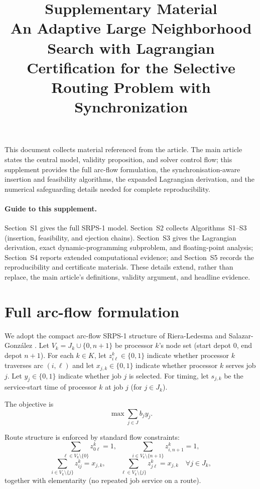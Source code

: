 \documentclass[11pt]{article}
\title{Supplementary Material\\
\large An Adaptive Large Neighborhood Search with Lagrangian Certification
for the Selective Routing Problem with Synchronization}
\author{}
\date{}
\begin{document}
\maketitle

\noindent
This document collects material referenced from the article. The main article
states the central model, validity proposition, and solver control flow; this
supplement provides the full arc-flow formulation, the synchronisation-aware
insertion and feasibility algorithms, the expanded Lagrangian derivation, and
the numerical safeguarding details needed for complete reproducibility.

\paragraph{Guide to this supplement.} Section~S1 gives the full SRPS-1 model.
Section~S2 collects Algorithms~S1--S3 (insertion, feasibility, and ejection
chains). Section~S3 gives the Lagrangian derivation, exact dynamic-programming
subproblem, and floating-point analysis; Section~S4 reports extended
computational evidence; and Section~S5 records the reproducibility and
certificate materials. These details extend, rather than replace, the main
article's definitions, validity argument, and headline evidence.

\section{Full arc-flow formulation}

We adopt the compact arc-flow SRPS-1 structure of Riera-Ledesma and Salazar-Gonz\'alez \cite{RieraLedesma2021SRPS}. Let $V_k=J_k\cup\{0,n+1\}$ be processor $k$'s node set (start depot $0$, end depot $n+1$). For each $k\in K$, let $z_{i\ell}^k\in\{0,1\}$ indicate whether processor $k$ traverses arc $(i,\ell)$ and let $x_{j,k}\in\{0,1\}$ indicate whether processor $k$ serves job $j$. Let $y_j\in\{0,1\}$ indicate whether job $j$ is selected. For timing, let $s_{j,k}$ be the service-start time of processor $k$ at job $j$ (for $j\in J_k$).

The objective is
\[
\max \sum_{j\in J} b_j y_j.
\]

Route structure is enforced by standard flow constraints:
\[
\sum_{\ell\in V_k\setminus\{0\}} z_{0\ell}^k = 1,\qquad
\sum_{i\in V_k\setminus\{n+1\}} z_{i,n+1}^k = 1,
\]
\[
\sum_{i\in V_k\setminus\{j\}} z_{ij}^k = x_{j,k},\qquad
\sum_{\ell\in V_k\setminus\{j\}} z_{j\ell}^k = x_{j,k}
\quad \forall j\in J_k,
\]
together with elementarity (no repeated job service on a route).
\end{document}

